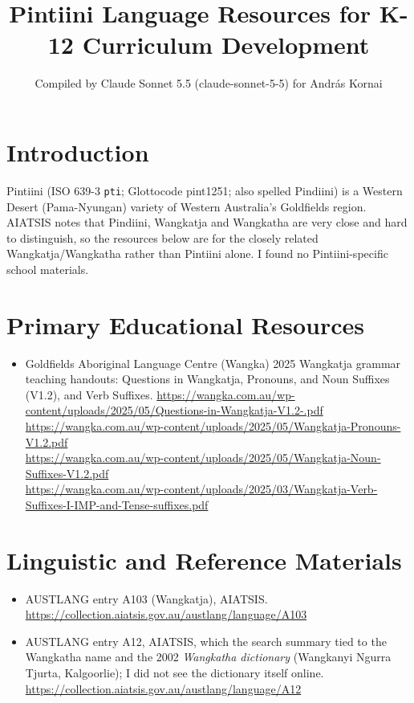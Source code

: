 \documentclass[12pt]{article}
\title{Pintiini Language Resources for K-12 Curriculum Development}
\author{Compiled by Claude Sonnet 5.5 (claude-sonnet-5-5) for Andr\'as Kornai}
\date{}
\begin{document}
\maketitle

\section{Introduction}
Pintiini (ISO 639-3 \texttt{pti}; Glottocode pint1251; also spelled Pindiini) is a Western Desert (Pama-Nyungan) variety of Western Australia's Goldfields region. AIATSIS notes that Pindiini, Wangkatja and Wangkatha are very close and hard to distinguish, so the resources below are for the closely related Wangkatja/Wangkatha rather than Pintiini alone. I found no Pintiini-specific school materials.

\section{Primary Educational Resources}
\begin{itemize}
\item Goldfields Aboriginal Language Centre (Wangka) 2025 Wangkatja grammar teaching handouts: Questions in Wangkatja, Pronouns, and Noun Suffixes (V1.2), and Verb Suffixes. \url{https://wangka.com.au/wp-content/uploads/2025/05/Questions-in-Wangkatja-V1.2-.pdf} \\ \url{https://wangka.com.au/wp-content/uploads/2025/05/Wangkatja-Pronouns-V1.2.pdf} \\ \url{https://wangka.com.au/wp-content/uploads/2025/05/Wangkatja-Noun-Suffixes-V1.2.pdf} \\ \url{https://wangka.com.au/wp-content/uploads/2025/03/Wangkatja-Verb-Suffixes-I-IMP-and-Tense-suffixes.pdf}
\end{itemize}

\section{Linguistic and Reference Materials}
\begin{itemize}
\item AUSTLANG entry A103 (Wangkatja), AIATSIS. \url{https://collection.aiatsis.gov.au/austlang/language/A103}
\item AUSTLANG entry A12, AIATSIS, which the search summary tied to the Wangkatha name and the 2002 \emph{Wangkatha dictionary} (Wangkanyi Ngurra Tjurta, Kalgoorlie); I did not see the dictionary itself online. \url{https://collection.aiatsis.gov.au/austlang/language/A12}
\end{itemize}
\end{document}
